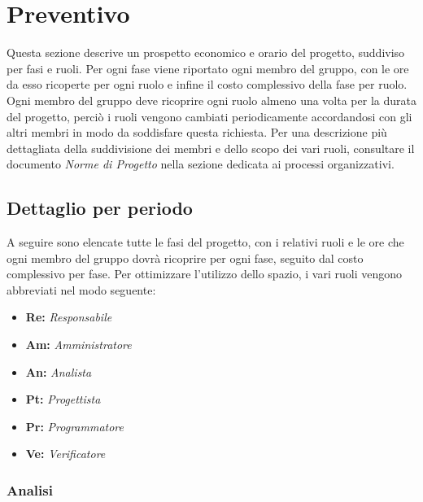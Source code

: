\newpage

\section{Preventivo}\label{sec:preventivo}

Questa sezione descrive un prospetto economico e orario del progetto, suddiviso per fasi e ruoli. Per ogni fase viene riportato ogni membro del gruppo, con le ore da esso ricoperte per ogni ruolo e infine il costo complessivo della fase per ruolo.
Ogni membro del gruppo deve ricoprire ogni ruolo almeno una volta per la durata del progetto, perciò i ruoli vengono cambiati periodicamente accordandosi con gli altri membri in modo da soddisfare questa richiesta.
Per una descrizione più dettagliata della suddivisione dei membri e dello scopo dei vari ruoli, consultare il documento \textit{Norme di Progetto} nella sezione dedicata ai processi organizzativi.\\

\subsection{Dettaglio per periodo}\label{sec:preventivo:periodi}
A seguire sono elencate tutte le fasi del progetto, con i relativi ruoli e le ore che ogni membro del gruppo dovrà ricoprire per ogni fase, seguito dal costo complessivo per fase. Per ottimizzare l'utilizzo dello spazio, i vari ruoli vengono abbreviati nel modo seguente:\\
\begin{itemize}
    \item \textbf{Re:} \textit{Responsabile}
    \item \textbf{Am:} \textit{Amministratore}
    \item \textbf{An:} \textit{Analista}
    \item \textbf{Pt:} \textit{Progettista}
    \item \textbf{Pr:} \textit{Programmatore}
    \item \textbf{Ve:} \textit{Verificatore}
\end{itemize}


\subsubsection{Analisi}\label{sec:preventivo:periodi:analisi}

